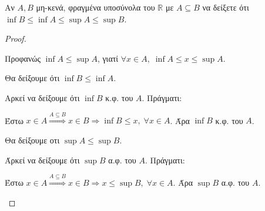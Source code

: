 \documentclass[main.tex]{subfiles}
\begin{document}
\begin{mypropbox}
  Αν $ A, B $ μη-κενά, φραγμένα υποσύνολα του 
  $ \mathbb{R} $ με $ A \subseteq B $ να δείξετε ότι 
  $ \inf B \leq \inf A \leq \sup A \leq \sup B $.
\end{mypropbox}
\begin{proof}
\item {} 
  \begin{myitemize}
    \item Προφανώς $ \inf A \leq \sup A $, γιατί $ \forall x \in A, \; 
      \inf A \leq x \leq \sup A $.
    \item Θα δείξουμε ότι $ \inf B \leq \inf A $. 

      Αρκεί να δείξουμε ότι $ \inf B $ κ.φ. του $A$. Πράγματι:

      Έστω $ x \in A \overset{A \subseteq B}{\Rightarrow} x \in B \Rightarrow 
      \inf B \leq x, \; \forall x \in A $. Άρα $ \inf B $ κ.φ. του $A$.
    \item Θα δείξουμε οτι $ \sup A \leq \sup B $. 

      Άρκεί να δείξουμε ότι $ \sup B $ α.φ. του $A$. Πράγματι:

      Έστω $ x \in A \overset{A \subseteq B}{\Rightarrow} x \in B \Rightarrow 
      x \leq \sup B, \; \forall x \in A $.  Άρα $ \sup B $ α.φ. του $A$.
  \end{myitemize}
\end{proof}
\end{document}

